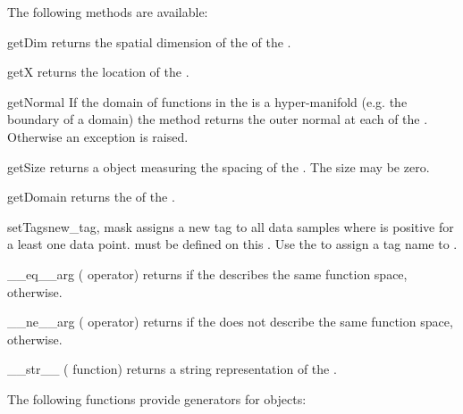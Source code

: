 \noindent The following methods are available:
%
\begin{methoddesc}[FunctionSpace]{getDim}{}
    returns the spatial dimension of the \Domain of the \FunctionSpace.
\end{methoddesc}
%
\begin{methoddesc}[FunctionSpace]{getX}{}
    returns the location of the \DataSamplePoints.
\end{methoddesc}
%
\begin{methoddesc}[FunctionSpace]{getNormal}{}
    If the domain of functions in the \FunctionSpace is a hyper-manifold (e.g.
    the boundary of a domain) the method returns the outer normal at each of
    the \DataSamplePoints. Otherwise an exception is raised.
\end{methoddesc}
%
\begin{methoddesc}[FunctionSpace]{getSize}{}
    returns a \Data object measuring the spacing of the \DataSamplePoints.
    The size may be zero.
\end{methoddesc}
%
\begin{methoddesc}[FunctionSpace]{getDomain}{}
    returns the \Domain of the \FunctionSpace.
\end{methoddesc}
%
\begin{methoddesc}[FunctionSpace]{setTags}{new_tag, mask}
    assigns a new tag  to all data samples where  is
    positive for a least one data point.
     must be defined on this \FunctionSpace.
    Use the  to assign a tag name to .
\end{methoddesc}
%
\begin{methoddesc}[FunctionSpace]{__eq__}{arg}
    (\PYTHON \var{==} operator) returns \True if the \FunctionSpace {}
    describes the same function space, \False otherwise.
\end{methoddesc}
%
\begin{methoddesc}[FunctionSpace]{__ne__}{arg}
    (\PYTHON \var{!=} operator) returns \True if the \FunctionSpace {}
    does not describe the same function space, \False otherwise.
\end{methoddesc}

\begin{methoddesc}[Domain]{__str__}{}
    (\PYTHON {} function) returns a string representation of the
    \FunctionSpace.
\end{methoddesc}

\noindent The following functions provide generators for \FunctionSpace objects:

